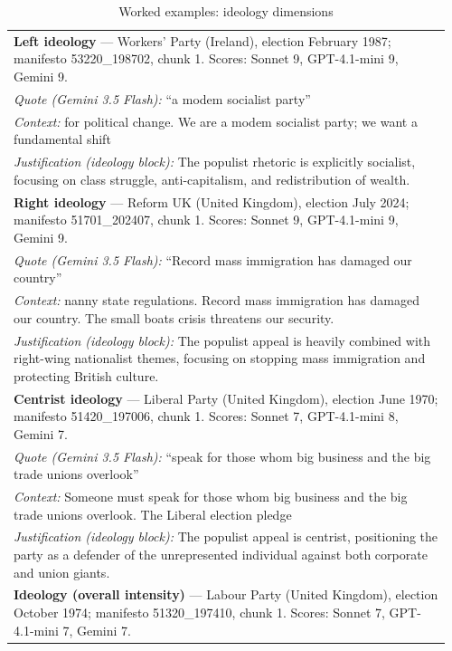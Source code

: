 {\footnotesize
\begin{longtable}{p{0.96\linewidth}}
\caption{Worked examples: ideology dimensions}\label{tab:oa9b} \\
\toprule
\textbf{Left ideology} --- Workers' Party (Ireland), election February 1987; manifesto 53220\_198702, chunk 1. Scores: Sonnet 9, GPT-4.1-mini 9, Gemini 9. \\
\quad \emph{Quote (Gemini 3.5 Flash):} ``a modem socialist party'' \\
\quad \emph{Context:} for political change. We are a modem socialist party; we want a fundamental shift \\
\quad \emph{Justification (ideology block):} The populist rhetoric is explicitly socialist, focusing on class struggle, anti-capitalism, and redistribution of wealth. \\
\midrule
\textbf{Right ideology} --- Reform UK (United Kingdom), election July 2024; manifesto 51701\_202407, chunk 1. Scores: Sonnet 9, GPT-4.1-mini 9, Gemini 9. \\
\quad \emph{Quote (Gemini 3.5 Flash):} ``Record mass immigration has damaged our country'' \\
\quad \emph{Context:} nanny state regulations. Record mass immigration has damaged our country. The small boats crisis threatens our security. \\
\quad \emph{Justification (ideology block):} The populist appeal is heavily combined with right-wing nationalist themes, focusing on stopping mass immigration and protecting British culture. \\
\midrule
\textbf{Centrist ideology} --- Liberal Party (United Kingdom), election June 1970; manifesto 51420\_197006, chunk 1. Scores: Sonnet 7, GPT-4.1-mini 8, Gemini 7. \\
\quad \emph{Quote (Gemini 3.5 Flash):} ``speak for those whom big business and the big trade unions overlook'' \\
\quad \emph{Context:} Someone must speak for those whom big business and the big trade unions overlook. The Liberal election pledge \\
\quad \emph{Justification (ideology block):} The populist appeal is centrist, positioning the party as a defender of the unrepresented individual against both corporate and union giants. \\
\midrule
\textbf{Ideology (overall intensity)} --- Labour Party (United Kingdom), election October 1974; manifesto 51320\_197410, chunk 1. Scores: Sonnet 7, GPT-4.1-mini 7, Gemini 7. \\

\end{longtable}}
